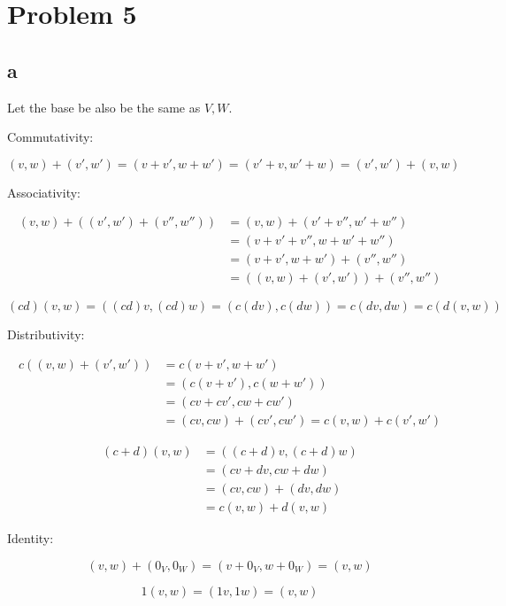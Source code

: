 \documentclass[12pt,letterpaper]{article}
\theoremstyle{definition}
\begin{document}
\section*{Problem 5}

\subsection*{a}

Let the base be also be the same as $V, W$.

Commutativity:

\[
  (v, w) + (v', w') = (v + v', w + w') = (v' + v, w' + w) = (v', w') + (v, w)
\]

Associativity:

\begin{align*}
  (v, w) + ((v', w') + (v'', w'')) &= (v, w) + (v' + v'', w' + w'') \\
                                   &= (v + v' + v'', w + w' + w'') \\
                                   &= (v + v', w + w') + (v'', w'') \\
                                   &= ((v, w) + (v', w')) + (v'', w'')
\end{align*}

\[
  (cd)(v, w) = ((cd)v, (cd)w) = (c(dv), c(dw)) = c(dv, dw) = c(d(v, w))
\]

Distributivity:

\begin{align*}
  c((v, w) + (v', w')) &= c(v + v', w + w') \\
                       &= (c(v + v'), c(w + w')) \\
                       &= (cv + cv', cw + cw') \\
                       &= (cv, cw) + (cv', cw') = c(v, w) + c(v', w')
\end{align*}

\begin{align*}
  (c + d)(v, w) &= ((c + d)v, (c + d)w) \\
                &= (cv + dv, cw + dw) \\
                &= (cv, cw) + (dv, dw) \\
                &= c(v, w) + d(v, w)
\end{align*}

Identity:

\[
  (v, w) + (0_V, 0_W) = (v + 0_V, w + 0_W) = (v, w)
\]

\[
  1(v, w) = (1v, 1w) = (v, w)
\]
\end{document}
